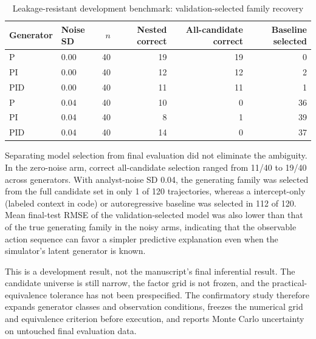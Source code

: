 \begin{table}[htbp]
\centering
\caption{Leakage-resistant development benchmark: validation-selected family recovery}
\begin{tabular}{llrrrr}
\toprule
Generator & Noise SD & $n$ & Nested correct & All-candidate correct & Baseline selected \\
\midrule
P   & 0.00 & 40 & 19 & 19 & 0 \\
PI  & 0.00 & 40 & 12 & 12 & 2 \\
PID & 0.00 & 40 & 11 & 11 & 1 \\
P   & 0.04 & 40 & 10 & 0  & 36 \\
PI  & 0.04 & 40 & 8  & 1  & 39 \\
PID & 0.04 & 40 & 14 & 0  & 37 \\
\bottomrule
\end{tabular}
\end{table}

Separating model selection from final evaluation did not eliminate the ambiguity. In the zero-noise arm, correct all-candidate selection ranged from 11/40 to 19/40 across generators. With analyst-noise SD 0.04, the generating family was selected from the full candidate set in only 1 of 120 trajectories, whereas a intercept-only (labeled context in code) or autoregressive baseline was selected in 112 of 120. Mean final-test RMSE of the validation-selected model was also lower than that of the true generating family in the noisy arms, indicating that the observable action sequence can favor a simpler predictive explanation even when the simulator's latent generator is known.

This is a development result, not the manuscript's final inferential result. The candidate universe is still narrow, the factor grid is not frozen, and the practical-equivalence tolerance has not been prespecified. The confirmatory study therefore expands generator classes and observation conditions, freezes the numerical grid and equivalence criterion before execution, and reports Monte Carlo uncertainty on untouched final evaluation data.
